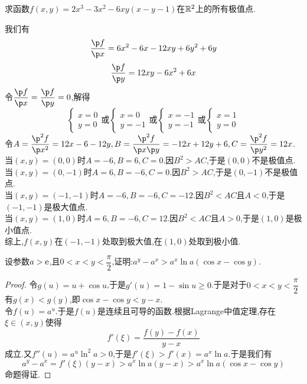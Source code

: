 \documentclass{ctexart}
\begin{document}
\begin{problem}[5.(12\songti{分})]
    求函数$f(x,y)=2x^3-3x^2-6xy(x-y-1)$在$\mathbb{R}^2$上的所有极值点.
\end{problem}
\begin{solution}
    我们有
    \[\dfrac{\p f}{\p x}=6x^2-6x-12xy+6y^2+6y\]
    \[\dfrac{\p f}{\p y}=12xy-6x^2+6x\]
    令$\dfrac{\p f}{\p x}=\dfrac{\p f}{\p y}=0$,解得
    \[\left\{\begin{array}{l}x=0\\y=0\end{array}\right.\text{或}
    \left\{\begin{array}{l}x=0\\y=-1\end{array}\right.\text{或}
    \left\{\begin{array}{l}x=-1\\y=-1\end{array}\right.\text{或}
    \left\{\begin{array}{l}x=1\\y=0\end{array}\right.\]
    令$A=\dfrac{\p^2f}{\p x^2}=12x-6-12y,B=\dfrac{\p^2 f}{\p x\p y}=-12x+12y+6,C=\dfrac{\p^2f}{\p y^2}=12x$.\\
    当$(x,y)=(0,0)$时$A=-6,B=6,C=0$.因$B^2>AC$,于是$(0,0)$不是极值点.\\
    当$(x,y)=(0,-1)$时$A=6,B=-6,C=0$.因$B^2>AC$,于是$(0,-1)$不是极值点.\\
    当$(x,y)=(-1,-1)$时$A=-6,B=-6,C=-12$.因$B^2<AC$且$A<0$,于是$(-1,-1)$是极大值点.\\
    当$(x,y)=(1,0)$时$A=6,B=-6,C=12$.因$B^2<AC$且$A>0$,于是$(1,0)$是极小值点.\\
    综上,$f(x,y)$在$(-1,-1)$处取到极大值,在$(1,0)$处取到极小值.
\end{solution}
\begin{problem}[6.(10\songti{分})]
    设参数$a>\mathrm{e}$,且$0<x<y<\dfrac\pi2$,证明:$a^y-a^x>a^x\ln a(\cos x-\cos y)$.
\end{problem}
\begin{proof}
    令$g(u)=u+\cos u$,于是$g'(u)=1-\sin u\geqslant0$.于是对于$0<x<y<\dfrac\pi2$有$g(x)<g(y)$,即$\cos x-\cos y<y-x$.\\
    令$f(u)=a^u$.于是$f(u)$是连续且可导的函数.根据Lagrange中值定理,存在$\xi\in(x,y)$使得
    \[f'(\xi)=\dfrac{f(y)-f(x)}{y-x}\]
    成立.又$f''(u)=a^u\ln^2a>0$,于是$f'(\xi)>f'(x)=a^x\ln a$.于是我们有
    \[a^y-a^x=f'(\xi)(y-x)>a^x\ln a(y-x)>a^x\ln a(\cos x-\cos y)\]
    命题得证.
\end{proof}
\end{document}
